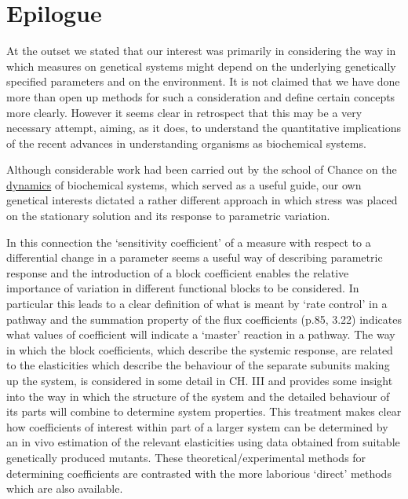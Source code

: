 \section{Epilogue}

At the outset we stated that our interest was primarily in considering the way in which measures on genetical systems might depend on the underlying genetically specified parameters and on the environment. It is not claimed that we have done more than open up methods for such a consideration and define certain concepts more clearly. However it seems clear in retrospect that this may be a very necessary attempt, aiming, as it does, to understand the quantitative implications of the recent advances in understanding organisms as biochemical systems.

Although considerable work had been carried out by the school of Chance on the \underline{dynamics} of biochemical systems, which served as a useful guide, our own genetical interests dictated a rather different approach in which stress was placed on the stationary solution and its response to parametric variation. 

In this connection the `sensitivity coefficient' of a measure with respect to a differential change in a parameter seems a useful way of describing parametric response and the introduction of a block coefficient enables the relative importance of variation in different functional blocks to be considered. In particular this leads to a clear definition of what is meant by `rate control' in a pathway and the summation property of the flux coefficients (p.85, 3.22) indicates what values of coefficient will indicate a `master' reaction in a pathway. The way in which the block coefficients, which describe the systemic response, are related to the elasticities which describe the behaviour of the separate subunits making up the system, is considered in some detail in CH. III and provides some insight into the way in which the structure of the system and the detailed behaviour of its parts will combine to determine system properties. This treatment makes clear how coefficients of interest within part of a larger system can be determined by an in vivo estimation of the relevant elasticities using data obtained from suitable genetically produced mutants. These theoretical/experimental methods for determining coefficients are contrasted with the more laborious `direct' methods which are also available.

